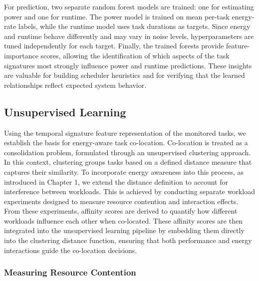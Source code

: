 For prediction, two separate random forest models are trained: one for estimating power and one for runtime. The power model is trained on mean per-task energy-rate labels, while the runtime model uses task durations as targets. Since energy and runtime behave differently and may vary in noise levels, hyperparameters are tuned independently for each target. Finally, the trained forests provide feature-importance scores, allowing the identification of which aspects of the task signatures most strongly influence power and runtime predictions. These insights are valuable for building scheduler heuristics and for verifying that the learned relationships reflect expected system behavior.

\subsection{Unsupervised Learning}
\label{sec:unsupervised_learning}
Using the temporal signature feature representation of the monitored tasks, we establish the basis for energy-aware task co-location. Co-location is treated as a consolidation problem, formulated through an unsupervised clustering approach. In this context, clustering groups tasks based on a defined distance measure that captures their similarity. To incorporate energy awareness into this process, as introduced in Chapter 1, we extend the distance definition to account for interference between workloads. This is achieved by conducting separate workload experiments designed to measure resource contention and interaction effects. From these experiments, affinity scores are derived to quantify how different workloads influence each other when co-located. These affinity scores are then integrated into the unsupervised learning pipeline by embedding them directly into the clustering distance function, ensuring that both performance and energy interactions guide the co-location decisions.

\subsubsection{Measuring Resource Contention}
\label{sec:measuring_resource_contention}

